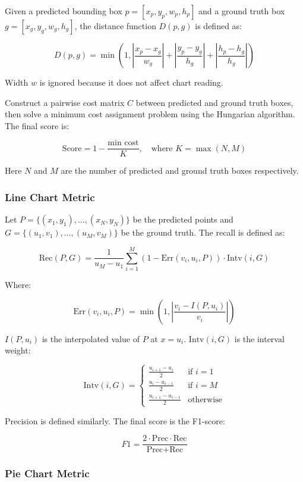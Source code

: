 \documentclass[
	letterpaper, %
]{jdf}
\begin{document}
Given a predicted bounding box $p = [x_p, y_p, w_p, h_p]$ and a ground truth box $g = [x_g, y_g, w_g, h_g]$, the distance function $D(p, g)$ is defined as:

\[
D(p, g) = \min\left(1, \left\lvert \frac{x_p - x_g}{w_g} \right\rvert + \left\lvert \frac{y_p - y_g}{h_g} \right\rvert + \left\lvert \frac{h_p - h_g}{h_g} \right\rvert\right)
\]

Width $w$ is ignored because it does not affect chart reading.

Construct a pairwise cost matrix $C$ between predicted and ground truth boxes, then solve a minimum cost assignment problem using the Hungarian algorithm. The final score is:

\[
\text{Score} = 1 - \frac{\text{min cost}}{K}, \quad \text{where } K = \max(N, M)
\]

Here $N$ and $M$ are the number of predicted and ground truth boxes respectively.

\subsubsection{Line Chart Metric}

Let $P = \{(x_1, y_1), \ldots, (x_N, y_N)\}$ be the predicted points and $G = \{(u_1, v_1), \ldots, (u_M, v_M)\}$ be the ground truth. The recall is defined as:

\[
\text{Rec}(P, G) = \frac{1}{u_M - u_1} \sum_{i=1}^{M} \left(1 - \text{Err}(v_i, u_i, P)\right) \cdot \text{Intv}(i, G)
\]

Where:

\[
\text{Err}(v_i, u_i, P) = \min\left(1, \left\lvert \frac{v_i - I(P, u_i)}{v_i} \right\rvert\right)
\]

$I(P, u_i)$ is the interpolated value of $P$ at $x = u_i$. $\text{Intv}(i, G)$ is the interval weight:

\[
\text{Intv}(i, G) =
\begin{cases}
\frac{u_{i+1} - u_i}{2} & \text{if } i = 1 \\
\frac{u_i - u_{i-1}}{2} & \text{if } i = M \\
\frac{u_{i+1} - u_{i-1}}{2} & \text{otherwise}
\end{cases}
\]

Precision is defined similarly. The final score is the F1-score:

\[
F1 = \frac{2 \cdot \text{Prec} \cdot \text{Rec}}{\text{Prec} + \text{Rec}}
\]

\subsubsection{Pie Chart Metric}
\end{document}
